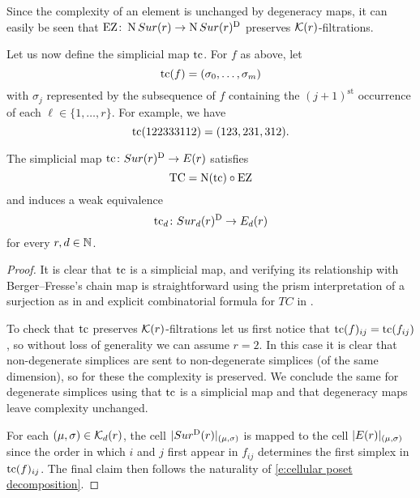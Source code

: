 Since the complexity of an element is unchanged by degeneracy maps, it can easily be seen that $\operatorname{EZ} \colon \operatorname{N}Sur(r) \to \operatorname{N}Sur(r)^{\mathrm{D}}$ preserves $\mathcal{K}(r)$-filtrations.

Let us now define the simplicial map $\operatorname{tc}$.
For $f$ as above, let
\[
\operatorname{tc}(f) = (\sigma_0,\dots,\sigma_m)
\]
with $\sigma_j$ represented by the subsequence of $f$ containing the $(j+1)^{\mathrm{st}}$ occurrence of each $\ell \in \{1,\dots,r\}$.
For example, we have
\[
\operatorname{tc}(122333112) = (123,231,312).
\]

\begin{theorem}
	The simplicial map $\operatorname{tc} \colon Sur(r)^{\mathrm{D}} \to E(r)$ satisfies
	\[
	\operatorname{TC} = \operatorname{N}(\operatorname{tc}) \circ \operatorname{EZ}
	\]
	and induces a weak equivalence
	\[
	\operatorname{tc}_d \colon Sur_d(r)^{\mathrm{D}} \to E_d(r)
	\]
	for every $r,d \in \mathbb{N}$.
\end{theorem}

\begin{proof}
	It is clear that $\operatorname{tc}$ is a simplicial map, and verifying its relationship with Berger--Fresse's chain map is straightforward using the prism interpretation of a surjection as in \cite[\S2.1]{berger2002prismatic} and explicit combinatorial formula for $TC$ in \cite[\S3.1]{berger2002prismatic}.

	To check that $\operatorname{tc}$ preserves $\mathcal{K}(r)$-filtrations let us first notice that $\operatorname{tc}(f)_{ij} = \operatorname{tc}(f_{ij})$, so without loss of generality we can assume $r=2$.
	In this case it is clear that non-degenerate simplices are sent to non-degenerate simplices (of the same dimension), so for these the complexity is preserved.
	We conclude the same for degenerate simplices using that $\operatorname{tc}$ is a simplicial map and that degeneracy maps leave complexity unchanged.

	For each $(\mu,\sigma) \in \mathcal{K}_d(r)$, the cell $\lvert Sur^{\mathrm{D}}(r)\rvert_{(\mu,\sigma)}$ is mapped to the cell $\lvert E(r)\rvert_{(\mu,\sigma)}$ since the order in which $i$ and $j$ first appear in $f_{ij}$ determines the first simplex in $\operatorname{tc}(f)_{ij}$.
	The final claim then follows the naturality of \eqref{e:cellular poset decomposition}.
\end{proof}
